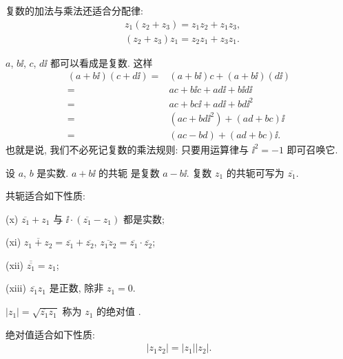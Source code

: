 \begin{proposition}
    复数的加法与乘法还适合分配律:
    \begin{align*}
         & z_1 (z_2 + z_3) = z_1 z_2 + z_1 z_3, \\
         & (z_2 + z_3) z_1 = z_2 z_1 + z_3 z_1.
    \end{align*}
\end{proposition}

\begin{remark}
    $a$, $b\ii$, $c$, $d\ii$ 都可以看成是复数. 这样
    \begin{align*}
        (a + b \ii) (c + d \ii)
        = {} & (a + b \ii) c + (a + b \ii) (d \ii)  \\
        = {} & ac + b \ii c + a d \ii + b \ii d \ii \\
        = {} & ac + bc\ii + ad\ii + bd\ii^2         \\
        = {} & (ac + bd\ii^2) + (ad + bc)\ii        \\
        = {} & (ac - bd) + (ad + bc)\ii.
    \end{align*}
    也就是说, 我们不必死记复数的乘法规则: 只要用运算律与 $\ii^2 = -1$ 即可召唤它.
\end{remark}

\begin{definition}
    设 $a$, $b$ 是实数. $a + b\ii$ 的共轭  是复数 $a - b\ii$. 复数 $z_1$ 的共轭可写为 $\overline{z_1}$.
\end{definition}

\begin{proposition}
    共轭适合如下性质:

    (x) $\overline{z_1} + z_1$ 与 $\ii \cdot (\overline{z_1} - z_1)$ 都是实数;

    (xi) $\overline{z_1 + z_2} = \overline{z_1} + \overline{z_2}$, $\overline{z_1 z_2} = \overline{z_1} \cdot \overline{z_2}$;

    (xii) $\overline{\overline{z_1}} = z_1$;

    (xiii) $\overline{z_1} z_1$ 是正数, 除非 $z_1 = 0$.
\end{proposition}

\begin{definition}
    $|z_1| = \sqrt{\overline{z_1} z_1}$ 称为 $z_1$ 的绝对值 .
\end{definition}

\begin{proposition}
    绝对值适合如下性质:
    \begin{align*}
        |z_1 z_2| = |z_1| |z_2|.
    \end{align*}
\end{proposition}

